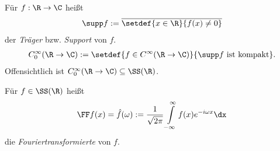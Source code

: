 \begin{defn}
\label{defn:2.5}
Für $f: \R\to\C$ heißt
\begin{align*}
\supp f := \overline{\setdef{x\in\R}{f(x)\neq 0}}
\end{align*}
der \emph{Träger} bzw. \emph{Support} von $f$.
\begin{align*}
C_0^\infty(\R\to\C) := \setdef{f\in C^\infty(\R\to\C)}{\supp f\text{ ist
kompakt}}.
\end{align*}
Offensichtlich ist $C_0^\infty(\R\to\C)\subseteq \SS(\R)$.\fishhere
\end{defn}

\begin{defn}[Fouriertransformation]
\label{defn:2.6}
Für $f\in\SS(\R)$ heißt
\begin{align*}
\FF f(x) = \hat{f}(\omega) := \frac{1}{\sqrt{2\pi}}\int\limits_{-\infty}^\infty
f(x)e^{-i\omega x}\dx
\end{align*}
die \emph{Fouriertransformierte} von $f$.\fishhere
\end{defn}

